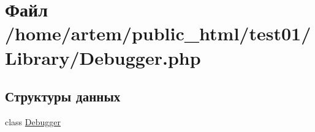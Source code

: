 \hypertarget{_debugger_8php}{\section{Файл /home/artem/public\-\_\-html/test01/\-Library/\-Debugger.php}
\label{_debugger_8php}
}
\subsection*{Структуры данных}
\begin{DoxyCompactItemize}
\item 
class \hyperlink{class_debugger}{Debugger}
\end{DoxyCompactItemize}
